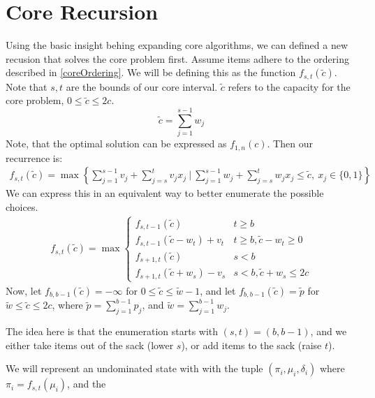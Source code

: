 \documentclass{article}
\begin{document}
\section{Core Recursion}
Using the basic insight behing expanding core algorithms, we can defined a new recusion that solves the core problem first. Assume items adhere to the ordering described in \ref{coreOrdering}. We will be defining this as the function $f_{s,t}(\tilde{c})$. Note that $s,t$ are the bounds of our core interval. $\tilde{c}$ refers to the capacity for the core problem, $0 \leq \tilde{c} \leq 2c$.
$$\tilde{c} = \sum\limits_{j=1}^{s-1} w_j$$
Note, that the optimal solution can be expressed as $f_{1,n}(c)$. Then our recurrence is:
\begin{equation}
    \begin{aligned}
        f_{s,t}(\tilde{c}) = \max \left\{\sum\limits_{j=1}^{s-1}v_j + \sum\limits_{j=s}^t v_j x_j \ \bigg| \  \sum\limits_{j=1}^{s-1}w_j + \sum\limits_{j=s}^t w_j x_j \leq \tilde{c}, \ x_j \in \{0,1\}\right\}
    \end{aligned}
\end{equation}
We can express this in an equivalent way to better enumerate the possible choices.
\begin{equation} \label{reccurence}
    \begin{aligned}
        f_{s,t}(\tilde{c}) = \max \begin{cases} f_{s,t-1}(\tilde{c}) &  t \geq b\\
    f_{s,t-1}(\tilde{c} - w_t) + v_t &  t \geq b, \tilde{c} - w_t \geq 0 \\
    f_{s+1,t}(\tilde{c}) & s < b\\
    f_{s+1,t}(\tilde{c} + w_s) - v_s & s < b, \tilde{c} + w_s \leq 2c \end{cases}
\end{aligned}
\end{equation}
Now, let $f_{b,b-1}(\tilde{c}) = -\infty$ for $0 \leq \tilde{c} \leq \tilde{w} - 1$, and let $f_{b,b-1}(\tilde{c}) = \tilde{p}$ for $\tilde{w} \leq \tilde{c} \leq 2c$, where $\tilde{p} = \sum\limits_{j=1}^{b-1}p_j$, and $\tilde{w} = \sum\limits_{j=1}^{b-1}w_j$. 

The idea here is that the enumeration starts with $(s,t) = (b, b-1)$, and we either take items out of the sack (lower $s$), or add items to the sack (raise $t$).

We will represent an undominated state with with the tuple $(\pi_i, \mu_i, \delta_i)$ where $\pi_i = f_{s,t}(\mu_i)$, and the 
\end{document}
